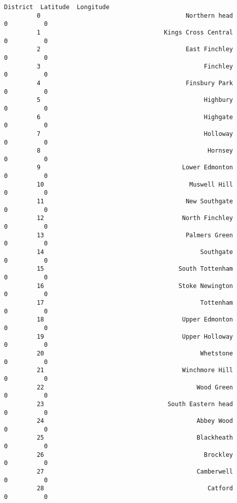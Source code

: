 \documentclass[11pt]{article}
\begin{document}
\begin{Verbatim}[commandchars=\\\{\}]
                                                       District  Latitude  Longitude  
         0                                        Northern head         0          0  
         1                                  Kings Cross Central         0          0  
         2                                        East Finchley         0          0  
         3                                             Finchley         0          0  
         4                                        Finsbury Park         0          0  
         5                                             Highbury         0          0  
         6                                             Highgate         0          0  
         7                                             Holloway         0          0  
         8                                              Hornsey         0          0  
         9                                       Lower Edmonton         0          0  
         10                                        Muswell Hill         0          0  
         11                                       New Southgate         0          0  
         12                                      North Finchley         0          0  
         13                                       Palmers Green         0          0  
         14                                           Southgate         0          0  
         15                                     South Tottenham         0          0  
         16                                     Stoke Newington         0          0  
         17                                           Tottenham         0          0  
         18                                      Upper Edmonton         0          0  
         19                                      Upper Holloway         0          0  
         20                                           Whetstone         0          0  
         21                                      Winchmore Hill         0          0  
         22                                          Wood Green         0          0  
         23                                  South Eastern head         0          0  
         24                                          Abbey Wood         0          0  
         25                                          Blackheath         0          0  
         26                                            Brockley         0          0  
         27                                          Camberwell         0          0  
         28                                             Catford         0          0  

\end{Verbatim}
\end{document}
